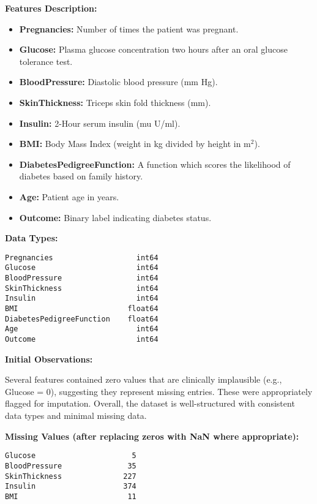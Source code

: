 \documentclass[conference]{IEEEtran}
\begin{document}
\vspace{0.5em}
\noindent\textbf{Features Description:}
\begin{itemize}
    \item \textbf{Pregnancies:} Number of times the patient was pregnant.
    \item \textbf{Glucose:} Plasma glucose concentration two hours after an oral glucose tolerance test.
    \item \textbf{BloodPressure:} Diastolic blood pressure (mm Hg).
    \item \textbf{SkinThickness:} Triceps skin fold thickness (mm).
    \item \textbf{Insulin:} 2-Hour serum insulin (mu U/ml).
    \item \textbf{BMI:} Body Mass Index (weight in kg divided by height in m$^2$).
    \item \textbf{DiabetesPedigreeFunction:} A function which scores the likelihood of diabetes based on family history.
    \item \textbf{Age:} Patient age in years.
    \item \textbf{Outcome:} Binary label indicating diabetes status.
\end{itemize}

\vspace{0.5em}
\noindent\textbf{Data Types:}
\begin{verbatim}
Pregnancies                   int64
Glucose                       int64
BloodPressure                 int64
SkinThickness                 int64
Insulin                       int64
BMI                         float64
DiabetesPedigreeFunction    float64
Age                           int64
Outcome                       int64
\end{verbatim}

\vspace{0.5em}
\noindent\textbf{Initial Observations:}

Several features contained zero values that are clinically implausible (e.g., Glucose = 0), suggesting they represent missing entries. These were appropriately flagged for imputation. Overall, the dataset is well-structured with consistent data types and minimal missing data.

\vspace{0.5em}
\noindent\textbf{Missing Values (after replacing zeros with NaN where appropriate):}
\begin{verbatim}
Glucose                      5
BloodPressure               35
SkinThickness              227
Insulin                    374
BMI                         11
\end{verbatim}
\end{document}
